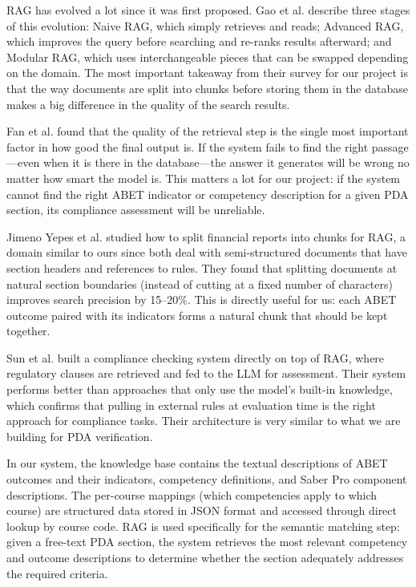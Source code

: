 \documentclass[conference]{IEEEtran}
\begin{document}
RAG has evolved a lot since it was first proposed. Gao et al. \cite{gao2024ragsurvey} describe three stages of this evolution: Naive RAG, which simply retrieves and reads; Advanced RAG, which improves the query before searching and re-ranks results afterward; and Modular RAG, which uses interchangeable pieces that can be swapped depending on the domain. The most important takeaway from their survey for our project is that the way documents are split into chunks before storing them in the database makes a big difference in the quality of the search results.

Fan et al. \cite{fan2024ragmeeting} found that the quality of the retrieval step is the single most important factor in how good the final output is. If the system fails to find the right passage---even when it is there in the database---the answer it generates will be wrong no matter how smart the model is. This matters a lot for our project: if the system cannot find the right ABET indicator or competency description for a given PDA section, its compliance assessment will be unreliable.

Jimeno Yepes et al. \cite{jimenoyepes2024chunking} studied how to split financial reports into chunks for RAG, a domain similar to ours since both deal with semi-structured documents that have section headers and references to rules. They found that splitting documents at natural section boundaries (instead of cutting at a fixed number of characters) improves search precision by 15--20\%. This is directly useful for us: each ABET outcome paired with its indicators forms a natural chunk that should be kept together.

Sun et al. \cite{sun2025compliance} built a compliance checking system directly on top of RAG, where regulatory clauses are retrieved and fed to the LLM for assessment. Their system performs better than approaches that only use the model's built-in knowledge, which confirms that pulling in external rules at evaluation time is the right approach for compliance tasks. Their architecture is very similar to what we are building for PDA verification.

In our system, the knowledge base contains the textual descriptions of ABET outcomes and their indicators, competency definitions, and Saber Pro component descriptions. The per-course mappings (which competencies apply to which course) are structured data stored in JSON format and accessed through direct lookup by course code. RAG is used specifically for the semantic matching step: given a free-text PDA section, the system retrieves the most relevant competency and outcome descriptions to determine whether the section adequately addresses the required criteria.
\end{document}
